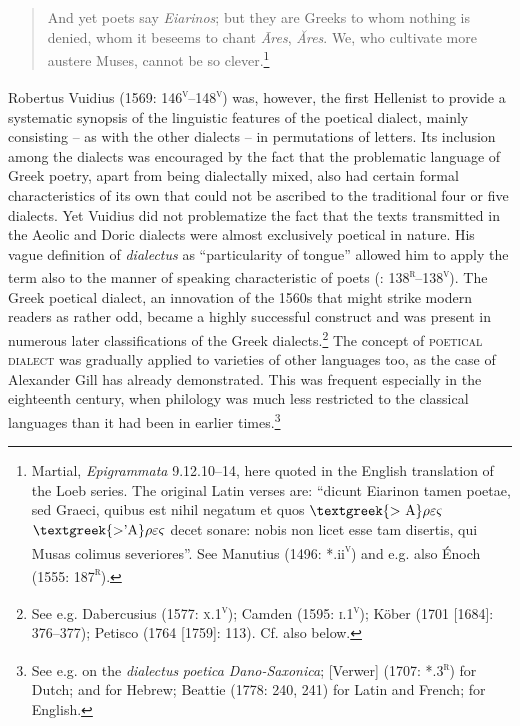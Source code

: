 \begin{quote}
And yet poets say \textit{Eiarinos}; {\textbar} but they are Greeks to whom nothing is denied, {\textbar} whom it beseems to chant \textit{Āres}, \textit{Ăres}. {\textbar} We, who cultivate more austere Muses, {\textbar} cannot be so clever.\footnote{Martial, \textit{Epigrammata} 9.12.10–14, here quoted in the English translation of the Loeb series. The original Latin verses are: “dicunt Eiarinon tamen poetae, {\textbar} sed Graeci, quibus est nihil negatum {\textbar} et quos $\text{\textgreek{>~A}}\rho \varepsilon \varsigma $ $\text{\textgreek{>'A}}\rho \varepsilon \varsigma $ decet sonare: {\textbar} nobis non licet esse tam disertis, {\textbar} qui Musas colimus severiores”. See Manutius (1496: *.ii\textsc{\textsuperscript{v}}) and e.g. also Énoch (1555: 187\textsc{\textsuperscript{r}}).}
\end{quote}

Robertus Vuidius (1569: 146\textsc{\textsuperscript{v}}–148\textsc{\textsuperscript{v}}) was, however, the first Hellenist to provide a systematic synopsis of the linguistic features of the poetical dialect, mainly consisting – as with the other dialects – in permutations of letters. Its inclusion among the dialects was encouraged by the fact that the problematic language of Greek poetry, apart from being dialectally mixed, also had certain formal characteristics of its own that could not be ascribed to the traditional four or five dialects. Yet Vuidius did not problematize the fact that the texts transmitted in the Aeolic and Doric dialects were almost exclusively poetical in nature. His vague definition of \textit{dialectus} as “particularity of tongue” allowed him to apply the term also to the manner of speaking characteristic of poets (\citealt{Vuidius1569}: 138\textsc{\textsuperscript{r}}–138\textsc{\textsuperscript{v}}). The Greek poetical dialect, an innovation of the 1560s that might strike modern readers as rather odd, became a highly successful construct and was present in numerous later classifications of the Greek dialects.\footnote{See e.g. Dabercusius (1577: \textsc{x}.1\textsc{\textsuperscript{v}}); Camden (1595: \textsc{i.1}\textsc{\textsuperscript{v}}); Köber (1701 [1684]: 376–377); Petisco (1764 [1759]: 113). Cf. also  below.} The concept of \textsc{poetical} \textsc{dialect} was gradually applied to varieties of other languages too, as the case of Alexander Gill has already demonstrated. This was frequent especially in the eighteenth century, when philology was much less restricted to the classical languages than it had been in earlier times.\footnote{See e.g. \citet[101]{Hickes1705} on the \textit{dialectus} \textit{poetica} \textit{Dano-Saxonica}; [Verwer] (1707: *.3\textsc{\textsuperscript{r}}) for Dutch; \citet[24]{Wesley1736} and \citet{Vogel1764} for Hebrew; Beattie (1778: 240, 241) for Latin and French; \citet[292]{MacNicol1779} for English.}

